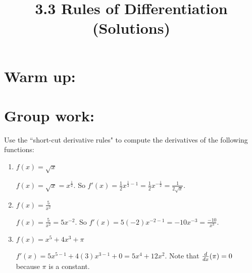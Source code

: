 \documentclass[nooutcomes]{ximera}
\title{3.3 Rules of Differentiation (Solutions)}
\begin{document}
\begin{abstract}		\end{abstract}
\maketitle

\section*{Warm up:} 
	
	\begin{freeResponse}
	\end{freeResponse}	
	
	
	
	
	

\section*{Group work:}

\begin{problem}
Use the ``short-cut derivative rules" to compute the derivatives of the following functions:
	
	\begin{enumerate}
	
	\item $f(x) = \sqrt{x}$
	
		\begin{freeResponse}
		$f(x) = \sqrt{x} = x^{\frac{1}{2}}.$  So $f'(x) = \frac{1}{2} x^{\frac{1}{2} - 1} = \frac{1}{2} x^{-\frac{1}{2}} = \frac{1}{2\sqrt{x}}$.
		\end{freeResponse}
			
			
	
	\item $f(x) = \frac{5}{x^2}$
	
		\begin{freeResponse}
		$f(x) = \frac{5}{x^2} = 5x^{-2}.$  So $f'(x) = 5(-2) x^{-2-1} = -10x^{-3} = \frac{-10}{x^3}$.  
		\end{freeResponse}
			
			
	
	\item $f(x) = x^5 + 4x^3 + \pi $
	
		\begin{freeResponse}
		$f'(x) = 5x^{5-1} + 4(3)x^{3-1} + 0 = 5x^4 + 12x^2$.  Note that $\frac{d}{dx} (\pi) = 0$ because $\pi$ is a constant.	
		\end{freeResponse}
			
			
	
	\end{enumerate}
\end{problem}
	
\end{document}
